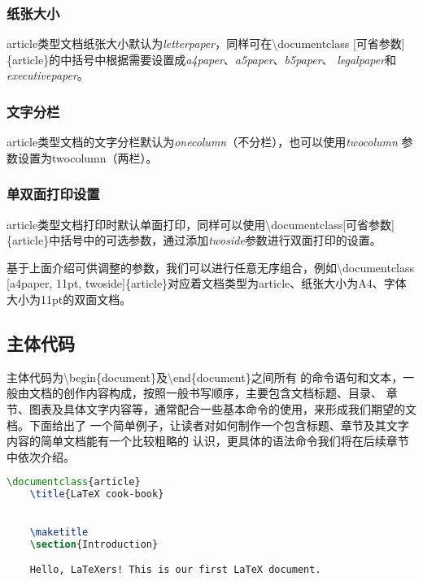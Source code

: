 \subsubsection{纸张大小}
article类型文档纸张大小默认为\emph{letterpaper}，同样可在\textbackslash documentclass
    [可省参数]\{article\}的中括号中根据需要设置成\emph{a4paper}、\emph{a5paper}、\emph{b5paper}、
\emph{legalpaper}和\emph{executivepaper}。

\subsubsection{文字分栏}
article类型文档的文字分栏默认为\emph{onecolumn}（不分栏），也可以使用\emph{twocolumn}
参数设置为twocolumn（两栏）。

\subsubsection{单双面打印设置}
article类型文档打印时默认单面打印，同样可以使用\textbackslash documentclass[可省参数]
\{article\}中括号中的可选参数，通过添加\emph{twoside}参数进行双面打印的设置。

\begin{tcolorbox}[colback=red!5!white, colframe=red!50!black, title=文档属性设置小结]
    基于上面介绍可供调整的参数，我们可以进行任意无序组合，例如\textbackslash documentclass
        [a4paper, 11pt, twoside]\{article\}对应着文档类型为article、纸张大小为A4、字体大小为11pt的双面文档。
\end{tcolorbox}

\subsection{主体代码}
主体代码为\textbackslash begin\{document\}及\textbackslash end\{document\}之间所有
的命令语句和文本，一般由文档的创作内容构成，按照一般书写顺序，主要包含文档标题、目录、
章节、图表及具体文字内容等，通常配合一些基本命令的使用，来形成我们期望的文档。下面给出了
一个简单例子，让读者对如何制作一个包含标题、章节及其文字内容的简单文档能有一个比较粗略的
认识，更具体的语法命令我们将在后续章节中依次介绍。
\begin{lstlisting}[language=TeX]
    \documentclass{article}
    \title{LaTeX cook-book}

    
    \maketitle
    \section{Introduction}

    Hello, LaTeXers! This is our first LaTeX document.

    
\end{lstlisting}

